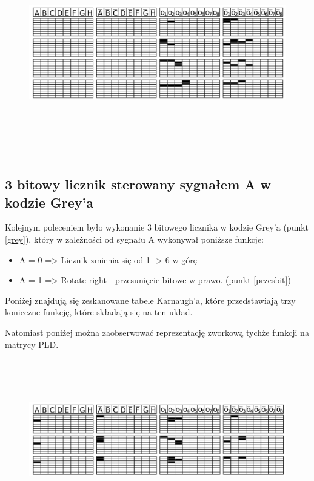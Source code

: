 \documentclass[a4paper,12pt]{article}
\begin{document}
\begin{justify}
\begin{figure}[h!]
\centering
\includegraphics[width=18cm, height=9cm]{licznik_modulo}
\end{figure}

\subsection{3 bitowy licznik sterowany sygnałem A w kodzie Grey'a}
\label{3bit}

Kolejnym poleceniem było wykonanie 3 bitowego licznika w kodzie Grey'a (punkt \ref{grey}), który w zależności od sygnału A wykonywał poniższe funkcje:
\begin{itemize}
\item A = 0 => Licznik zmienia się od 1 -> 6 w górę
\item A = 1 => Rotate right - przesunięcie bitowe w prawo. (punkt \ref{przesbit})
\end{itemize}

Poniżej znajdują się zeskanowane tabele Karnaugh'a, które przedstawiają trzy konieczne funkcję, które składają się na ten układ.

\newpage





\newpage

Natomiast poniżej można zaobserwować reprezentację zworkową tychże funkcji na matrycy PLD.

\begin{figure}[h!]
\centering
\includegraphics[width=18cm, height=7cm]{licznik_grey}
\end{figure}


\end{justify}
\end{document}
